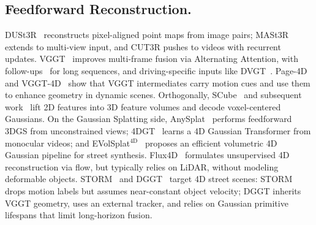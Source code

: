 \subsection{Feedforward Reconstruction.}
DUSt3R~\cite{wang2024dust3r} reconstructs pixel-aligned point maps from image pairs; MASt3R~\cite{duisterhof2025mastrsfm} extends to multi-view input, and CUT3R pushes to videos with recurrent updates. VGGT~\cite{vggt} improves multi-frame fusion via Alternating Attention, with follow-ups~\cite{vggtlong} for long sequences, and driving-specific inputs like DVGT~\cite{zuo2025dvgt}. Page-4D~\cite{page4d} and VGGT-4D~\cite{hu2025vggt4d} show that VGGT intermediates carry motion cues and use them to enhance geometry in dynamic scenes. Orthogonally, SCube~\cite{ren2024scube} and subsequent work~\cite{lu2025infinicube} lift 2D features into 3D feature volumes and decode voxel-centered Gaussians. On the Gaussian Splatting side, AnySplat~\cite{jiang2025anysplat} performs feedforward 3DGS from unconstrained views; 4DGT~\cite{xu20254dgt} learns a 4D Gaussian Transformer from monocular videos; and EVolSplat$^\text{4D}$~\cite{miao2026evolsplat4d} proposes an efficient volumetric 4D Gaussian pipeline for street synthesis. Flux4D~\cite{wangflux4d} formulates unsupervised 4D reconstruction via flow, but typically relies on LiDAR, without modeling deformable objects. STORM~\cite{yang2024storm} and DGGT~\cite{chen2025dggt} target 4D street scenes: STORM drops motion labels but assumes near-constant object velocity; DGGT inherits VGGT geometry, uses an external tracker, and relies on Gaussian primitive lifespans that limit long-horizon fusion.
